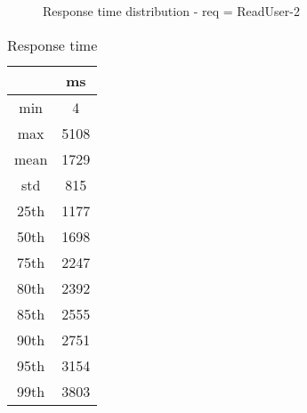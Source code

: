\begin{minipage}{0.75\linewidth}
\begin{figure}[h]
\begin{adjustbox}{max width=1.0\linewidth, keepaspectratio}
  \end{adjustbox}
  \caption{Response time distribution - req = ReadUser-2}
\end{figure}
\end{minipage}\hfill\begin{minipage}{0.18\linewidth}
\begin{table}[h]
\begin{tabular}{|cc|}
\hline
\textbf{} & \textbf{ms}\\ \hline
 \Xhline{0.005\arrayrulewidth}
min & 4\\
 \Xhline{0.005\arrayrulewidth}
max & 5108\\
 \Xhline{0.005\arrayrulewidth}
mean & 1729\\
 \Xhline{0.005\arrayrulewidth}
std & 815\\
\hline
\hline
 \Xhline{0.005\arrayrulewidth}
25th & 1177\\
 \Xhline{0.005\arrayrulewidth}
50th & 1698\\
 \Xhline{0.005\arrayrulewidth}
75th & 2247\\
 \Xhline{0.005\arrayrulewidth}
80th & 2392\\
 \Xhline{0.005\arrayrulewidth}
85th & 2555\\
 \Xhline{0.005\arrayrulewidth}
90th & 2751\\
 \Xhline{0.005\arrayrulewidth}
95th & 3154\\
 \Xhline{0.005\arrayrulewidth}
99th & 3803\\
\hline
\end{tabular}
\caption{Response time}
\end{table}
\end{minipage}\hfill